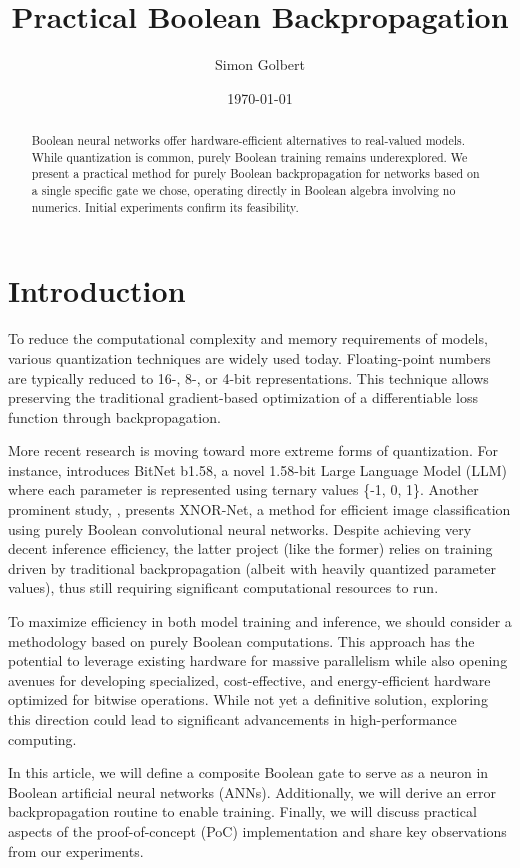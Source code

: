 \documentclass{article}
\title{Practical Boolean Backpropagation}
\author{Simon Golbert}
\date{\today}
\theoremstyle{definition}
\theoremstyle{remark}
\begin{document}
\maketitle

\begin{abstract}
    Boolean neural networks offer hardware-efficient alternatives to real-valued models. While quantization is common, purely Boolean training remains underexplored. We present a practical method for purely Boolean backpropagation for networks based on a single specific gate we chose, operating directly in Boolean algebra involving no numerics. Initial experiments confirm its feasibility.
\end{abstract}

\section{Introduction}
To reduce the computational complexity and memory requirements of models, various quantization techniques are widely used today. Floating-point numbers are typically reduced to 16-, 8-, or 4-bit representations. This technique allows preserving the traditional gradient-based optimization of a differentiable loss function through backpropagation.

More recent research is moving toward more extreme forms of quantization. For instance, \cite{ma2024} introduces BitNet b1.58, a novel 1.58-bit Large Language Model (LLM) where each parameter is represented using ternary values \{-1, 0, 1\}. Another prominent study, \cite{rastegari2016}, presents XNOR-Net, a method for efficient image classification using purely Boolean convolutional neural networks. Despite achieving very decent inference efficiency, the latter project (like the former) relies on training driven by traditional backpropagation (albeit with heavily quantized parameter values), thus still requiring significant computational resources to run.

To maximize efficiency in both model training and inference, we should consider a methodology based on purely Boolean computations. This approach has the potential to leverage existing hardware for massive parallelism while also opening avenues for developing specialized, cost-effective, and energy-efficient hardware optimized for bitwise operations. While not yet a definitive solution, exploring this direction could lead to significant advancements in high-performance computing.

In this article, we will define a composite Boolean gate to serve as a neuron in Boolean artificial neural networks (ANNs). Additionally, we will derive an error backpropagation routine to enable training. Finally, we will discuss practical aspects of the proof-of-concept (PoC) implementation and share key observations from our experiments.
\end{document}
